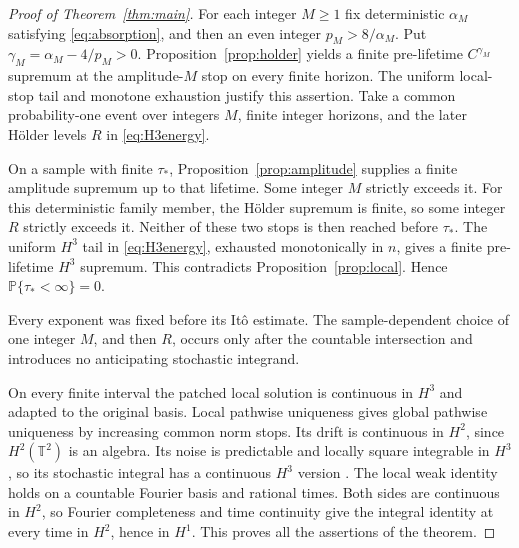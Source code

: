 \documentclass[11pt]{amsart}
\theoremstyle{remark}
\numberwithin{equation}{section}
\newcommand{\T}{\mathbb T}
\newcommand{\PP}{\mathbb P}
\begin{document}
\begin{proof}[Proof of Theorem~\ref{thm:main}]
For each integer $M\geq1$ fix deterministic $\alpha_M$ satisfying
\eqref{eq:absorption}, and then an even integer $p_M>8/\alpha_M$.
Put $\gamma_M=\alpha_M-4/p_M>0$. Proposition~\ref{prop:holder} yields a
finite pre-lifetime $C^{\gamma_M}$ supremum at the amplitude-$M$ stop on
every finite horizon. The uniform local-stop tail and monotone exhaustion
justify this assertion. Take a common probability-one event over integers
$M$, finite integer horizons, and the later H\"older levels $R$ in
\eqref{eq:H3energy}.

On a sample with finite $\tau_*$, Proposition~\ref{prop:amplitude} supplies
a finite amplitude supremum up to that lifetime. Some integer $M$ strictly
exceeds it. For this deterministic family member, the H\"older supremum is
finite, so some integer $R$ strictly exceeds it. Neither of these two stops
is then reached before $\tau_*$. The uniform $H^3$ tail in
\eqref{eq:H3energy}, exhausted monotonically in $n$, gives a finite
pre-lifetime $H^3$ supremum. This contradicts Proposition~\ref{prop:local}.
Hence $\PP\{\tau_*<\infty\}=0$.

Every exponent was fixed before its It\^o estimate. The sample-dependent
choice of one integer $M$, and then $R$, occurs only after the countable
intersection and introduces no anticipating stochastic integrand.

On every finite interval the patched local solution is continuous in $H^3$
and adapted to the original basis. Local pathwise uniqueness gives global
pathwise uniqueness by increasing common norm stops. Its drift is continuous
in $H^2$, since $H^2(\T^2)$ is an algebra. Its noise is predictable and
locally square integrable in $H^3$, so its stochastic integral has a continuous
$H^3$ version \cite[Proposition 2.1]{BVNVW}. The local weak identity holds
on a countable Fourier basis and rational times. Both sides are continuous
in $H^2$, so Fourier completeness and time continuity give the integral
identity at every time in $H^2$, hence in $H^1$. This proves all the assertions
of the theorem.
\end{proof}
\end{document}
